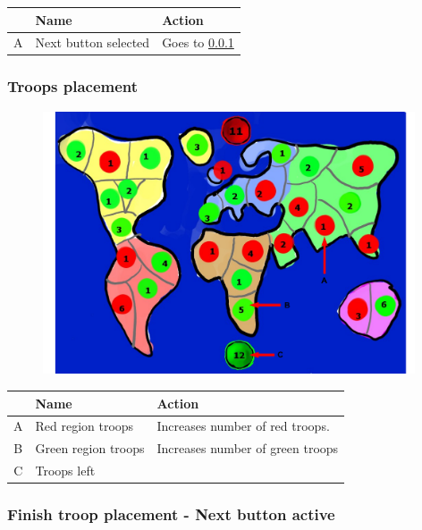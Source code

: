 \documentclass[12pt,a4paper]{article}
\begin{document}
\begin{table}[H]
\small
\centering
\begin{tabular}{c|p{5cm}|p{7cm}}
& Name & Action \\ \hline\hline
A
&Next button selected
&Goes to \ref{mock:735}
\end{tabular}
\end{table}


\newpage
\subsubsection{Troops placement}\label{mock:735}

\begin{figure}[H]
  \centering
  \includegraphics[width=11cm]{pic/mocks/3-5.pdf}
\end{figure}

\begin{table}[H]
\small
\centering
\begin{tabular}{c|p{5cm}|p{7cm}}
& Name & Action \\ \hline\hline
A
&Red region troops
&Increases number of red troops.
\\B
&Green region troops
&Increases number of green troops
\\C
&Troops left
&
\end{tabular}
\end{table}

\newpage
\subsubsection{Finish troop placement - Next button active}\label{mock:736}
\end{document}
